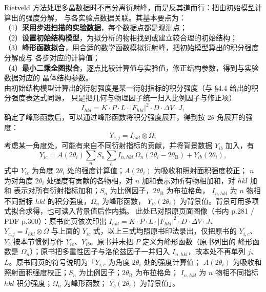 \begin{principle}
Rietveld 方法处理多晶数据时不再分离衍射峰，而是反其道而行：把由初始模型计算出的强度分解，
与各实验点数据关联。其基本要点为：\\
（1）\textbf{采用步进扫描的实验数据}，每个数据点都是观测点；\\
（2）\textbf{设置初始结构模型}，为拟分析的物相找到或建立较合理的初始结构；\\
（3）\textbf{峰形函数拟合}，用合适的数学函数模拟衍射峰，把初始模型算出的积分强度分解成与
各步对应的计算值；\\
（4）\textbf{最小二乘全图拟合}，逐点比较计算值与实验值，修正结构参数，得到与实验数据对应的
晶体结构参数。\\
由初始结构模型计算出的衍射强度是某一衍射指标的积分强度（与 §4.4 给出的积分强度表达式同源，
只是把几何与物理因子统一归入比例因子与修正项）
\begin{equation}
I_{hkl}=K\cdot P\cdot L\cdot\left|F_{hkl}\right|^{2}\cdot D\cdot\Delta V\cdot J ,
\label{eq:ch04c-ihkl}
\end{equation}
确定了峰形函数后，可以通过峰形函数将积分强度展开，得到按 $2\theta$ 角展开的强度：
\begin{equation}
Y_{c,j}=I_{hkl}\otimes\Omega ,
\label{eq:ch04c-rietconv}
\end{equation}
考虑某一角度处，可能有来自不同衍射指标的贡献，并将背景数据 $Y_{ib}$ 加入，有
\begin{equation}
Y_{ic}=A(2\theta_{i})\sum_{n}S_{n}\sum_{h}I_{n,hkl}\,
\Omega_{n}\!\left(2\theta_{i}-2\theta_{\mathrm{B}}\right)+Y_{ib}(2\theta_{i}),
\label{eq:ch04c-rietveld}
\end{equation}
式中 $Y_{ic}$ 为角度 $2\theta_{i}$ 处的强度计算值；$A(2\theta_{i})$ 为吸收和照射面积强度校正；
$n$ 为对角度 $2\theta_{i}$ 处强度有贡献的各物相，对 $n$ 加和表示对所有物相加和，对 $hkl$ 加和
表示对所有衍射指标加和；$S_{n}$ 为比例因子，$2\theta_{\mathrm{B}}$ 为布拉格角，
$I_{n,hkl}$ 为 $n$ 物相不同指标 $hkl$ 的积分强度，$\Omega_{n}$ 为峰形函数，
$Y_{ib}(2\theta_{i})$ 为背景值。背景可用多项式拟合求得，也可读入背景值后作内插。
此处已对照原页面图像（书内 p.281 / PDF p.300）：原书此页依次印出
$I_{hkl}=K\cdot P\cdot L\cdot|F_{hkl}|^{2}\cdot D\cdot\Delta V\cdot J$、
$Y_{c,j}=I_{hkl}\otimes\Omega$ 与上面的 $Y_{ic}$ 式，以上三式均照原书印法录出，仅把原书的
$Y_{i,c}$、$Y_{b}$ 按本节惯例写作 $Y_{ic}$、$Y_{ib}$。原书并未把 $P$ 定义为峰形函数（原书列出的
峰形函数是 $\Omega_{n}$）；原书把多重性因子与洛伦兹因子一并归入 $I_{n,hkl}$，故本处不再单列
$j$、$L$。原书同页的符号说明为「$Y_{i,c}$ 为角度 $2\theta_{i}$ 处的强度计算值；
$A(2\theta_{i})$ 为吸收和照射面积强度校正；$S_{n}$ 为比例因子；$2\theta_{\mathrm{B}}$ 为布拉格角；
$I_{n,hkl}$ 为 $n$ 物相不同指标 $hkl$ 积分强度；$\Omega_{n}$ 为峰形函数；
$Y_{b}(2\theta_{i})$ 为背景值」。
\end{principle}

